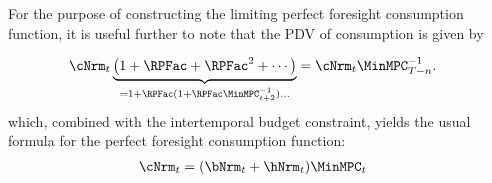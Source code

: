 \documentclass[\econtexRoot/BufferStockTheory]{subfiles}
\begin{document}
For the purpose of constructing the limiting perfect foresight consumption function, it is useful further to note that the PDV of consumption is given by\hypertarget{MPCnvrsIsCPDV}{}

\begin{eqnarray*}
  \cNrm_{t}\underbrace{\left(1 + \RPFac + \RPFac^{2} + \cdots \right)}_{=1+\RPFac(1+\RPFac\MinMPC_{t+2}^{-1})\ldots}   & = \cNrm_{t}\MinMPC_{T-n}^{-1}.
\end{eqnarray*}
which, combined with the intertemporal budget constraint, yields the usual formula for the perfect foresight consumption function:
\begin{equation}\begin{gathered}\begin{aligned}
  \cNrm_{t} & = (\bNrm_{t}+\hNrm_{t})\MinMPC_{t}
\end{aligned}\end{gathered}\end{equation}
\end{document}
